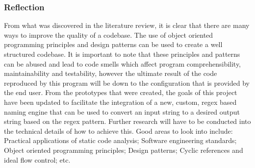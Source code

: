 \subsubsection{Reflection}
From what was discovered in the literature review, it is clear that there are many ways to improve the quality of a codebase. The use of object oriented programming principles and design patterns can be used to create a well structured codebase. It is important to note that these principles and patterns can be abused and lead to code smells which affect program comprehensibility, maintainability and testability, however the ultimate result of the code reproduced by this program will be down to the configuration that is provided by the end user.
From the prototypes that were created, the goals of this project have been updated to facilitate the integration of a new, custom, regex based naming engine that can be used to convert an input string to a desired output string based on the regex pattern.
Further research will have to be conducted into the technical details of how to achieve this. Good areas to look into include: Practical applications of static code analysis; Software engineering standards; Object oriented programming principles; Design patterns; Cyclic references and ideal flow control; etc.
